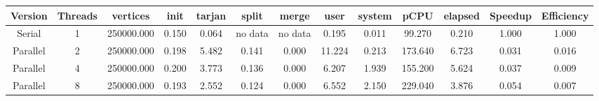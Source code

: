 \begin{tabular}{|c|c|c|c|c|c|c|c|c|c|c|c|c|}
\toprule
 Version &  Threads &   vertices &  init &  tarjan &   split &   merge &   user &  system &    pCPU &  elapsed &  Speedup &  Efficiency \\
\midrule
  Serial &        1 & 250000.000 & 0.150 &   0.064 & no data & no data &  0.195 &   0.011 &  99.270 &    0.210 &    1.000 &       1.000 \\
Parallel &        2 & 250000.000 & 0.198 &   5.482 &   0.141 &   0.000 & 11.224 &   0.213 & 173.640 &    6.723 &    0.031 &       0.016 \\
Parallel &        4 & 250000.000 & 0.200 &   3.773 &   0.136 &   0.000 &  6.207 &   1.939 & 155.200 &    5.624 &    0.037 &       0.009 \\
Parallel &        8 & 250000.000 & 0.193 &   2.552 &   0.124 &   0.000 &  6.552 &   2.150 & 229.040 &    3.876 &    0.054 &       0.007 \\
\bottomrule
\end{tabular}
